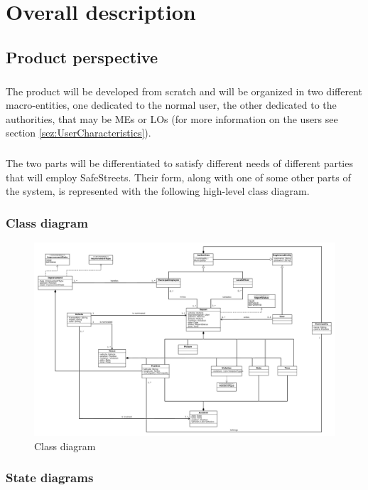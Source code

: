 \chapter{Overall description}
		\section{Product perspective}
			\paragraph{}
				The product will be developed from scratch and will be organized in two different macro-entities, one dedicated to the normal user, the other dedicated to the authorities, that may be MEs or LOs (for more information on the users see section \ref{sez:UserCharacteristics}). 
			\paragraph{}
				The two parts will be differentiated to satisfy different needs of different parties that will employ
SafeStreets. Their form, along with one of some other parts of the system, is represented with the following
high-level class diagram.
			\subsection{Class diagram}
				\begin{figure}[htbp]
  					\includegraphics[width=\textwidth]{images/ClassDiagram/SafeStreetsUML.pdf}
  					\caption{Class diagram}
				\end{figure}
			\subsection{State diagrams}
